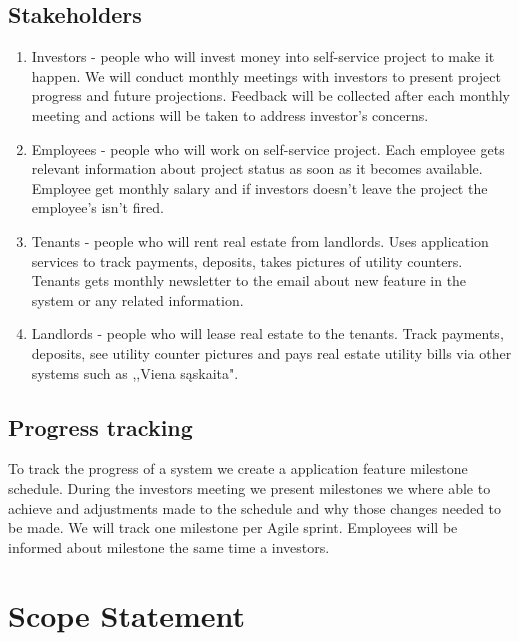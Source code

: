 \documentclass{VUMIFPSkursinis}
\begin{document}
	\subsection{Stakeholders}
		\begin{enumerate}
			\item{Investors - people who will invest money into self-service project to make it happen. 
				We will conduct monthly meetings with investors to present project progress and future projections.
				Feedback will be collected after each monthly meeting and actions will be taken to address investor's concerns.}
			\item{Employees - people who will work on self-service project.
				Each employee gets relevant information about project status as soon as it becomes available.
				Employee get monthly salary and if investors doesn't leave the project the employee's isn't fired.}
			\item{Tenants - people who will rent real estate from landlords.
					Uses application services to track payments, deposits, takes pictures of utility counters.
					Tenants gets monthly newsletter to the email about new feature in the system or any related information.}
			\item{Landlords - people who will lease real estate to the tenants.
					Track payments, deposits, see utility counter pictures and pays real estate utility bills via other systems such as ,,Viena sąskaita".}
		\end{enumerate}

	\subsection{Progress tracking}
		To track the progress of a system we create a application feature milestone schedule.
		During the investors meeting we present milestones we where able to achieve and adjustments made to the schedule and why those changes needed to be made.
		We will track one milestone per Agile sprint.
		Employees will be informed about milestone the same time a investors.


\section{Scope Statement}
\end{document}
